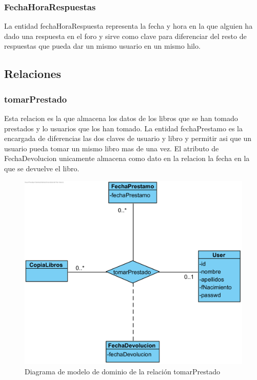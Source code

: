 ﻿\documentclass{report}
\begin{document}
                \subsubsection{FechaHoraRespuestas}
                    La entidad fechaHoraRespuesta representa la fecha y hora en la que alguien ha dado una respuesta en el foro y sirve como clave para diferenciar del resto de respuestas que pueda dar un mismo usuario en un mismo hilo.
            \clearpage
            \subsection{Relaciones}
                \subsubsection{tomarPrestado}
                    Esta relacion es la que almacena los datos de los libros que se han tomado prestados y lo usuarios que los han tomado. La entidad fechaPrestamo es la encargada de diferencias las dos claves de usuario y libro y permitir asi que un usuario pueda tomar un mismo libro mas de una vez. El atributo de FechaDevolucion unicamente almacena como dato en la relacion la fecha en la que se devuelve el libro.
                    \begin{figure}[H]
                        \centering
                        \includegraphics[width=1.0\textwidth]{img/dominio/tomarPrestado.png}
                        \caption{Diagrama de modelo de dominio de la relación tomarPrestado}
                    \end{figure}
                \clearpage
\end{document}
